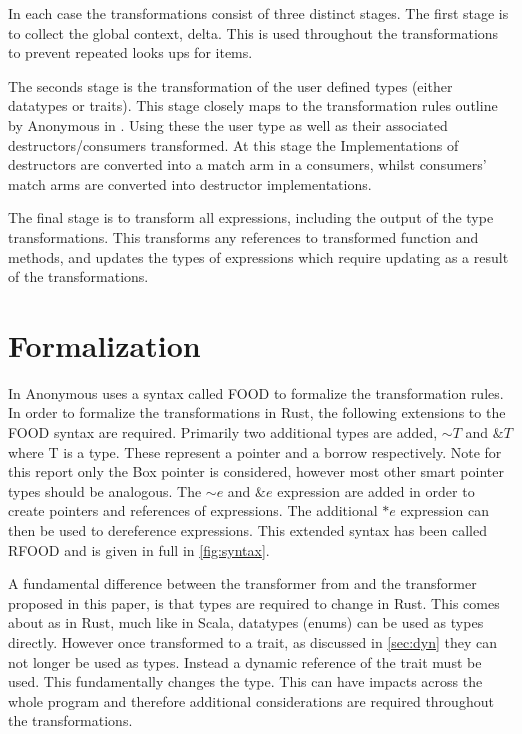 \documentclass[ oneside,%
                    author={James Elgar},
                    degree={MEng},
                     title={Bidirectional transformer between functional and \\ object-oriented programming in Rust},
                  subtitle={}]{dissertation}
\newcommand{\weixin}{Anonymous }
\begin{document}
In each case the transformations consist of three distinct stages. The first stage is to collect the global context, delta. This is used throughout the transformations to prevent repeated looks ups for items.

The seconds stage is the transformation of the user defined types (either datatypes or traits). This stage closely maps to the transformation rules outline by \weixin in \cite{food}.
Using these the user type as well as their associated destructors/consumers transformed. At this stage the  Implementations of destructors are converted into a match arm in a consumers, whilst consumers' match arms are converted into  destructor implementations.

The final stage is to transform all expressions, including the output of the type transformations. This transforms any references to transformed function and methods, and updates the types of expressions which require updating as a result of the transformations.

\section{Formalization}

In \cite{food} \weixin uses a syntax called FOOD to formalize the transformation rules. In order to formalize the transformations in Rust, the following extensions to the FOOD syntax are required. Primarily two additional types are added, $\sim T$ and $\& T$ where T is a type. These represent a pointer and a borrow respectively. Note for this report only the Box pointer is considered, however most other smart pointer types should be analogous. The $\sim e$ and $\& e$ expression are added in order to create pointers and references of expressions. The additional $*e$ expression can then be used to dereference expressions. This extended syntax has been called RFOOD and is given in full in \autoref{fig:syntax}.

A fundamental difference between the transformer from \cite{food} and the transformer proposed in this paper, is that types are required to change in Rust. This comes about as in Rust, much like in Scala, datatypes (enums) can be used as types directly. However once transformed to a trait, as discussed in \autoref{sec:dyn} they can not longer be used as types. Instead a dynamic reference of the trait must be used. This fundamentally changes the type. This can have impacts across the whole program and therefore additional considerations are required throughout the transformations.
\end{document}
